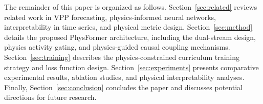 The remainder of this paper is organized as follows. Section~\ref{sec:related} reviews related work in VPP forecasting, physics-informed neural networks, interpretability in time series, and physical metric design. Section~\ref{sec:method} details the proposed PhysFormer architecture, including the dual-stream design, physics activity gating, and physics-guided causal coupling mechanisms. Section~\ref{sec:training} describes the physics-constrained curriculum training strategy and loss function design. Section~\ref{sec:experiments} presents comparative experimental results, ablation studies, and physical interpretability analyses. Finally, Section~\ref{sec:conclusion} concludes the paper and discusses potential directions for future research.
